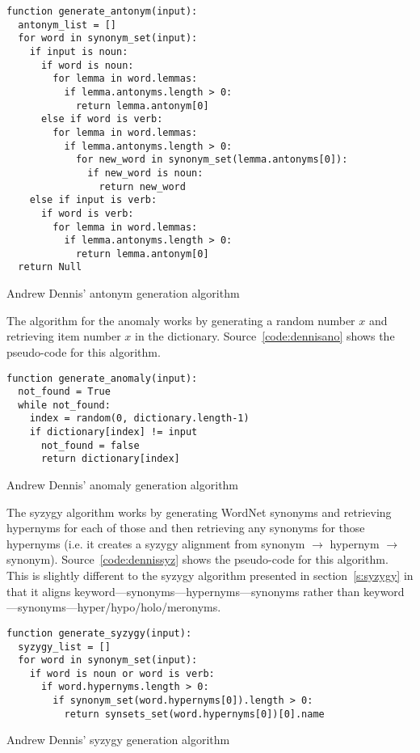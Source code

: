 \begin{listing}[!htbp] %
  \begin{verbatim}
function generate_antonym(input):
  antonym_list = []
  for word in synonym_set(input):
    if input is noun:
      if word is noun:
        for lemma in word.lemmas:
          if lemma.antonyms.length > 0:
            return lemma.antonym[0]
      else if word is verb:
        for lemma in word.lemmas:
          if lemma.antonyms.length > 0:
            for new_word in synonym_set(lemma.antonyms[0]):
              if new_word is noun:
                return new_word
    else if input is verb:
      if word is verb:
        for lemma in word.lemmas:
          if lemma.antonyms.length > 0:
            return lemma.antonym[0]
  return Null
  \end{verbatim}
\caption[Dennis' antonym generation]{Andrew Dennis' antonym generation algorithm}
\label{code:dennisanto}
\end{listing}

The algorithm for the anomaly works by generating a random number $x$ and retrieving item number $x$ in the dictionary. Source~\ref{code:dennisano} shows the pseudo-code for this algorithm.

\begin{listing}[!htbp] %
  \begin{verbatim}
function generate_anomaly(input):
  not_found = True
  while not_found:
    index = random(0, dictionary.length-1)
    if dictionary[index] != input
      not_found = false
      return dictionary[index]
  \end{verbatim}
\caption[Dennis' anomaly generation]{Andrew Dennis' anomaly generation algorithm}
\label{code:dennisano}
\end{listing}

The syzygy algorithm works by generating WordNet synonyms and retrieving hypernyms for each of those and then retrieving any synonyms for those hypernyms (i.e. it creates a syzygy alignment from synonym $\to$ hypernym $\to$ synonym). Source~\ref{code:dennissyz} shows the pseudo-code for this algorithm. This is slightly different to the syzygy algorithm presented in section~\ref{s:syzygy} in that it aligns keyword---synonyms---hypernyms---synonyms rather than keyword---synonyms---hyper/hypo/holo/meronyms.

\begin{listing}[!htbp] %
  \begin{verbatim}
function generate_syzygy(input):
  syzygy_list = []
  for word in synonym_set(input):
    if word is noun or word is verb:
      if word.hypernyms.length > 0:
        if synonym_set(word.hypernyms[0]).length > 0:
          return synsets_set(word.hypernyms[0])[0].name
  \end{verbatim}
\caption[Dennis' syzygy generation]{Andrew Dennis' syzygy generation algorithm}
\label{code:dennissyz}
\end{listing}

